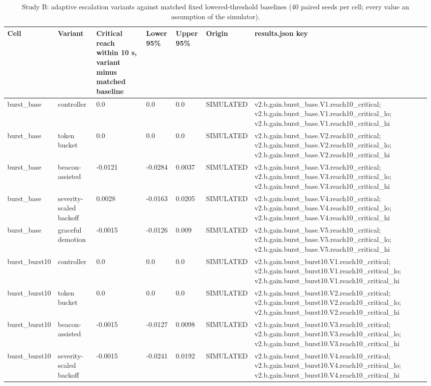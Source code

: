 \begin{table}[t]
\centering
\small
\caption{Study B: adaptive escalation variants against matched fixed lowered-threshold baselines (40 paired seeds per cell; every value an assumption of the simulator).}
\label{tab:v2_tab_adaptive}
\begin{tabular}{lllllll}
\toprule
Cell & Variant & Critical reach within 10 s, variant minus matched baseline & Lower 95\% & Upper 95\% & Origin & results.json key \\
\midrule
burst\_base & controller & 0.0 & 0.0 & 0.0 & SIMULATED & v2.b.gain.burst\_base.V1.reach10\_critical; v2.b.gain.burst\_base.V1.reach10\_critical\_lo; v2.b.gain.burst\_base.V1.reach10\_critical\_hi \\
burst\_base & token bucket & 0.0 & 0.0 & 0.0 & SIMULATED & v2.b.gain.burst\_base.V2.reach10\_critical; v2.b.gain.burst\_base.V2.reach10\_critical\_lo; v2.b.gain.burst\_base.V2.reach10\_critical\_hi \\
burst\_base & beacon-assisted & -0.0121 & -0.0284 & 0.0037 & SIMULATED & v2.b.gain.burst\_base.V3.reach10\_critical; v2.b.gain.burst\_base.V3.reach10\_critical\_lo; v2.b.gain.burst\_base.V3.reach10\_critical\_hi \\
burst\_base & severity-scaled backoff & 0.0028 & -0.0163 & 0.0205 & SIMULATED & v2.b.gain.burst\_base.V4.reach10\_critical; v2.b.gain.burst\_base.V4.reach10\_critical\_lo; v2.b.gain.burst\_base.V4.reach10\_critical\_hi \\
burst\_base & graceful demotion & -0.0015 & -0.0126 & 0.009 & SIMULATED & v2.b.gain.burst\_base.V5.reach10\_critical; v2.b.gain.burst\_base.V5.reach10\_critical\_lo; v2.b.gain.burst\_base.V5.reach10\_critical\_hi \\
burst\_burst10 & controller & 0.0 & 0.0 & 0.0 & SIMULATED & v2.b.gain.burst\_burst10.V1.reach10\_critical; v2.b.gain.burst\_burst10.V1.reach10\_critical\_lo; v2.b.gain.burst\_burst10.V1.reach10\_critical\_hi \\
burst\_burst10 & token bucket & 0.0 & 0.0 & 0.0 & SIMULATED & v2.b.gain.burst\_burst10.V2.reach10\_critical; v2.b.gain.burst\_burst10.V2.reach10\_critical\_lo; v2.b.gain.burst\_burst10.V2.reach10\_critical\_hi \\
burst\_burst10 & beacon-assisted & -0.0015 & -0.0127 & 0.0098 & SIMULATED & v2.b.gain.burst\_burst10.V3.reach10\_critical; v2.b.gain.burst\_burst10.V3.reach10\_critical\_lo; v2.b.gain.burst\_burst10.V3.reach10\_critical\_hi \\
burst\_burst10 & severity-scaled backoff & -0.0015 & -0.0241 & 0.0192 & SIMULATED & v2.b.gain.burst\_burst10.V4.reach10\_critical; v2.b.gain.burst\_burst10.V4.reach10\_critical\_lo; v2.b.gain.burst\_burst10.V4.reach10\_critical\_hi \\

\end{tabular}
\end{table}
